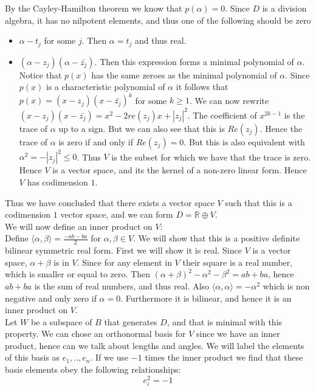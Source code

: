 \documentclass[../Thesis.tex]{subfiles}
\begin{document}
\begin{myproof}
By the Cayley-Hamilton theorem we know that $p(\alpha) = 0$. Since $D$ is a division algebra, it has no nilpotent elements, and thus one of the following should be zero
\begin{itemize}
\item $\alpha -t_j$ for some $j$. Then $\alpha = t_j$ and thus real.
\item $(\alpha - z_j)(\alpha - \bar{z_j})$. Then this expression forms a minimal polynomial of $\alpha$. Notice that $p(x)$ has the same zeroes as the minimal polynomial of $\alpha$. Since $p(x)$ is a characteristic polynomial of $\alpha$ it follows that $p(x) = (x - z_j)(x - \bar{z_j})^k$ for some $k \geq 1$. We can now rewrite $(x - z_j)(x - \bar{z_j}) = x^2  - 2 re(z_j) x + |z_j|^2$. The coefficient of $x^{2k-1}$ is the trace of $\alpha$ up to a sign. But we can also see that this is $Re(z_j)$. Hence the trace of $\alpha$ is zero if and only if $Re(z_j) = 0$. But this is also equivalent with $\alpha^2 = -|z_j|^2 \leq 0$. Thus $V$ is the subset for which we have that the trace is zero. Hence $V$ is a vector space, and its the kernel of a non-zero linear form. Hence $V$ has codimension $1$.
\end{itemize}
Thus we have concluded that there exists a vector space $V$ such that this is a codimension $1$ vector space, and we can form $D = \mathbb{R}\oplus V$.
\\We will now define an inner product on $V$:
\\Define $\langle \alpha, \beta \rangle = \frac{-ab - ba}{2}$ for $\alpha, \beta \in V$. We will show that this is a positive definite bilinear symmetric real form. First we will show it is real. Since $V$ is a vector space, $\alpha + \beta$ is in $V$. Since for any element in $V$ their square is a real number, which is smaller or equal to zero. Then $(\alpha + \beta)^2 - \alpha^2 - \beta^2 = ab + ba$, hence $ab + ba$ is the sum of real numbers, and thus real. Also $\langle \alpha, \alpha \rangle = -\alpha^2$ which is non negative and only zero if $\alpha = 0$. Furthermore it is bilinear, and hence it is an inner product on $V$.
\\Let $W$ be a subspace of $B$ that generates $D$, and that is minimal with this property. We can chose an orthonormal basis for $V$ since we have an inner product, hence can we talk about lengths and angles. We will label the elements of this basis as $e_1, .., e_n$. If we use $-1$ times the inner product we find that these basis elements obey the following relationships:
\begin{equation}
e_i^2 = -1
\end{equation}


\end{myproof}
\end{document}
